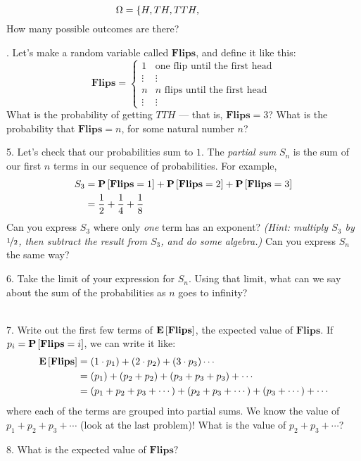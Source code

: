 \documentclass[10pt]{article}
\newcommand{\prob}[1]{\mathbf{P}\hspace{-0.2pt}\left[#1\right]}
\newcommand{\expect}[1]{\mathbf{E}\hspace{-0.2pt}\left[#1\right]}
\begin{document}
	{\LARGE $$ \hspace{-5em}\Omega = \left\{ H, TH, TTH, \right.$$ }
	How many possible outcomes are there?
	
	. Let's make a random variable called $\mathbf{Flips}$, and define it like this: $$ \mathbf{Flips} = \begin{cases} 1 & \text{one flip until the first head}  \\ \vdots & \vdots \\ n & \text{$n$ flips until the first head} \\ \vdots & \vdots \end{cases}$$
	What is the probability of getting $TTH$ --- that is, $\mathbf{Flips} = 3$? What is the probability that $\mathbf{Flips} = n$, for some natural number $n$?
	
	\vspace{0.07\textheight}
	5. Let's check that our probabilities sum to $1$. The \textit{partial sum} $S_n$ is the sum of our first $n$ terms in our sequence of probabilities. For example,
	\begin{align*}
 		S_3 &= \prob{\mathbf{Flips} = 1} + \prob{\mathbf{Flips} = 2}  + \prob{\mathbf{Flips} = 3} \\
 		&= \frac 12 + \frac 14 + \frac 18
 	\end{align*}
 	Can you express $S_3$ where only \textit{one} term has an exponent? \textit{(Hint: multiply $S_3$ by $\nicefrac 12$, then subtract the result from $S_3$, and do some algebra.)} Can you express $S_n$ the same way?
 	
 	\vspace{0.1\textheight}
 	6. Take the limit of your expression for $S_n$. Using that limit, what can we say about the sum of the probabilities as $n$ goes to infinity?
 	
 	\vspace{4em}
	\dotfill \\[1em]
	
	7. Write out the first few terms of $\expect{\mathbf{Flips}}$, the expected value of $\mathbf{Flips}$. If $p_i = \prob{\mathbf{Flips} = i}$, we can write it like:
		\begin{align*}
			\expect{\mathbf{Flips}} &= (1 \cdot p_1) + (2 \cdot p_2) + (3 \cdot p_3)\cdots \\
			&= (p_1) + (p_2 + p_2) + (p_3 + p_3 + p_3) + \cdots \\
			&= (p_1 + p_2 + p_3 + \cdots) + (p_2 + p_3 + \cdots) + (p_3 + \cdots) + \cdots
		\end{align*}
		where each of the terms are grouped into partial sums. We know the value of $p_1 + p_2 + p_3 + \cdots$ (look at the last problem)! What is the value of $p_2 + p_3 + \cdots$?
		
	\vspace{6em}
	
	8. What is the expected value of $\mathbf{Flips}?$
	
\end{document}
